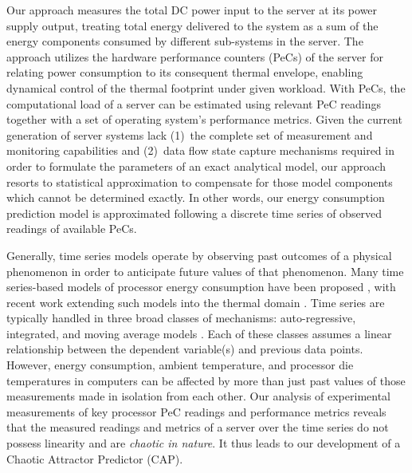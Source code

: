Our approach measures the total DC power input to the server at its
power supply output, treating total energy delivered to the system as a
sum of the energy components consumed by different sub-systems in the
server.  The approach utilizes the hardware performance counters (PeCs)
of the server for relating power consumption to its consequent thermal
envelope, enabling dynamical control of the thermal footprint under
given workload.  With PeCs, the computational load of a server can be
estimated using relevant PeC readings together with a set of operating
system's performance metrics.  Given the current generation of server
systems lack (1)~the complete set of measurement and monitoring
capabilities and (2)~data flow state capture mechanisms required in
order to formulate the parameters of an exact analytical model, our
approach resorts to statistical approximation to compensate for those
model components which cannot be determined exactly.  In other words,
our energy consumption prediction model is approximated following a
discrete time series of observed readings of available PeCs.

Generally, time series models operate by observing past outcomes of a
physical phenomenon in order to anticipate future values of that
phenomenon.  Many time series-based models of processor energy
consumption have been proposed
\cite{Rivoire2008a,Bhattacharjee2009,Reich2010}, with recent work
extending such models into the thermal domain \cite{Coskun2008}.  Time
series are typically handled in three broad classes of mechanisms:
auto-regressive, integrated, and moving average models \cite{Box1994}.
Each of these classes assumes a linear relationship between the
dependent variable(s) and previous data points. However, energy
consumption, ambient temperature, and processor die temperatures in
computers can be affected by more than just past values of those
measurements made in isolation from each other.  Our analysis of
experimental measurements of key processor PeC readings and performance
metrics reveals that the measured readings and metrics of a server over
the time series do not possess linearity and are \textit{chaotic in
  nature}.  It thus leads to our development of a Chaotic Attractor
Predictor (CAP).

